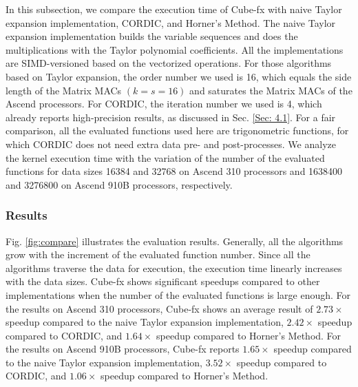 In this subsection, we compare the execution time of Cube-fx with naive Taylor expansion implementation, CORDIC, and Horner's Method. The naive Taylor expansion implementation builds the variable sequences and does the multiplications with the Taylor polynomial coefficients. All the implementations are SIMD-versioned based on the vectorized operations. For those algorithms based on Taylor expansion, the order number we used is 16, which equals the side length of the Matrix MACs $(k = s = 16)$ and saturates the Matrix MACs of the Ascend processors. For CORDIC, the iteration number we used is 4, which already reports high-precision results, as discussed in Sec. \ref{Sec: 4.1}. For a fair comparison, all the evaluated functions used here are trigonometric functions, for which CORDIC does not need extra data pre- and post-processes. We analyze the kernel execution time with the variation of the number of the evaluated functions for data sizes 16384 and 32768 on Ascend 310 processors and 1638400 and 3276800 on Ascend 910B processors, respectively.

\subsubsection{Results}

Fig. \ref{fig:compare} illustrates the evaluation results. Generally, all the algorithms grow with the increment of the evaluated function number. Since all the algorithms traverse the data for execution, the execution time linearly increases with the data sizes. Cube-fx shows significant speedups compared to other implementations when the number of the evaluated functions is large enough. For the results on Ascend 310 processors, Cube-fx shows an average result of $2.73\times$ speedup compared to the naive Taylor expansion implementation, $2.42\times$ speedup compared to CORDIC, and $1.64\times$ speedup compared to Horner's Method. For the results on Ascend 910B processors, Cube-fx reports $1.65\times$ speedup compared to the naive Taylor expansion implementation, $3.52\times$ speedup compared to CORDIC, and $1.06\times$ speedup compared to Horner's Method.

